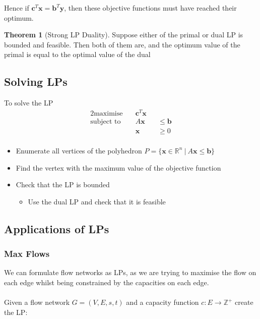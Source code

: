 \documentclass{article}
\theoremstyle{plain}
\theoremstyle{definition}
\newtheorem{thm}{Theorem}
\begin{document}
        Hence if $\mathbf{c}^T \mathbf{x} = \mathbf{b}^T \mathbf{y}$, then these objective functions must have reached their optimum. 
        \begin{thm}[Strong LP Duality]
            Suppose either of the primal or dual LP is bounded and feasible. Then both of them are, and the optimum value of the primal is equal to the optimal value of the dual
        \end{thm}
    \subsection{Solving LPs}
        To solve the LP 
        \begin{alignat*}{2}
        \text{maximise} &\quad \mathbf{c}^T \mathbf{x}  && \\
        \text{subject to} &\quad A \mathbf{x} &&\leq \mathbf{b} \\
        &\quad \mathbf{x} &&\geq 0 \\
        \end{alignat*}
        \begin{itemize}
            \item Enumerate all vertices of the polyhedron $P = \{ \mathbf{x} \in \mathbb{R}^n \ | \ A \mathbf{x} \leq \mathbf{b} \}$
            \item Find the vertex with the maximum value of the objective function
            \item Check that the LP is bounded
            \begin{itemize}
                \item Use the dual LP  and check that it is feasible
            \end{itemize}
        \end{itemize}

    \subsection{Applications of LPs}
        \subsubsection{Max Flows}
            We can formulate flow networks as LPs, as we are trying to maximise the flow on each edge whilst being constrained by the capacities on each edge. \\ \\ 
            Given a flow network $G = (V,E,s,t)$ and a capacity function $c : E \to \mathbb{Z}^+$ create the LP:
            
\end{document}
